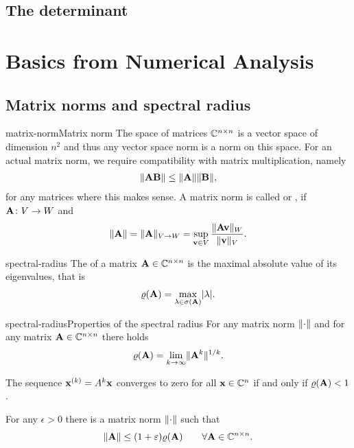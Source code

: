 \section{The determinant}


\chapter{Basics from Numerical Analysis}


\section{Matrix norms and spectral radius}

\begin{Definition*}{matrix-norm}{Matrix norm}
  The space of matrices $\mathbb C^{n\times n}$ is a vector space of dimension $n^2$ and thus any vector space norm is a norm on this space. For an actual matrix norm, we require compatibility with matrix multiplication, namely
  \begin{gather}
    \lVert\mathbf A\mathbf B\rVert \le \lVert\mathbf A\rVert\lVert\mathbf B\rVert,
  \end{gather}
  for any matrices where this makes sense. A matrix norm is called  or , if $\mathbf A\colon V\to W$ and
  \begin{gather}
    \lVert\mathbf A\rVert = \lVert\mathbf A\rVert_{V\to W} = \sup_{\mathbf v\in V}\frac{\lVert\mathbf A\mathbf v\rVert_W}{\lVert\mathbf v\rVert_V}.
  \end{gather}
\end{Definition*}

\begin{Definition}{spectral-radius}
  The  of a matrix $\mathbf A\in\mathbb C^{n\times n}$ is the
  maximal absolute value of its eigenvalues, that is
  \begin{gather}
    \varrho(\mathbf A) = \max_{\lambda\in\sigma(\mathbf A)} \lvert\lambda\rvert.
  \end{gather}
\end{Definition}

\begin{Lemma*}{spectral-radius}{Properties of the spectral radius}
  For any matrix norm $\lVert\cdot\rVert$ and for any matrix $\mathbf A\in\mathbb C^{n\times n}$ there holds
  \begin{gather}
    \varrho(\mathbf A) = \lim_{k\to\infty} \lVert\mathbf A^k\rVert^{1/k}.
  \end{gather}

  The sequence $\mathbf x^{(k)} = A^k\mathbf x$ converges to zero for all
  $\mathbf x\in\mathbb C^n$ if and only if $\varrho(\mathbf A)<1$.

  For any $\epsilon>0$
  there is a matrix norm $\lVert\cdot\rVert$ such that
  \begin{gather}
    \lVert\mathbf A\rVert \le (1+\varepsilon) \varrho(\mathbf A) \qquad \forall \mathbf A\in\mathbb C^{n\times n}.
  \end{gather}
\end{Lemma*}

